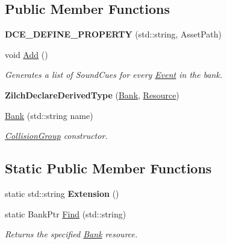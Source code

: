 \subsection*{Public Member Functions}
\begin{DoxyCompactItemize}
\item 
\hypertarget{classDCEngine_1_1Bank_afd76b244ded7d26fe0d197536d9193bb}{{\bfseries D\-C\-E\-\_\-\-D\-E\-F\-I\-N\-E\-\_\-\-P\-R\-O\-P\-E\-R\-T\-Y} (std\-::string, Asset\-Path)}\label{classDCEngine_1_1Bank_afd76b244ded7d26fe0d197536d9193bb}

\item 
\hypertarget{classDCEngine_1_1Bank_a0ec1031f0e4d80f1bdd2d27a2929a5eb}{void \hyperlink{classDCEngine_1_1Bank_a0ec1031f0e4d80f1bdd2d27a2929a5eb}{Add} ()}\label{classDCEngine_1_1Bank_a0ec1031f0e4d80f1bdd2d27a2929a5eb}

\begin{DoxyCompactList}\small\item\em Generates a list of Sound\-Cues for every \hyperlink{classDCEngine_1_1Event}{Event} in the bank. \end{DoxyCompactList}\item 
\hypertarget{classDCEngine_1_1Bank_aaf783acc5b1ef653f29e54ec52bd3610}{{\bfseries Zilch\-Declare\-Derived\-Type} (\hyperlink{classDCEngine_1_1Bank}{Bank}, \hyperlink{classDCEngine_1_1Resource}{Resource})}\label{classDCEngine_1_1Bank_aaf783acc5b1ef653f29e54ec52bd3610}

\item 
\hypertarget{classDCEngine_1_1Bank_ae83da3f3d70606509782927cf08e227b}{\hyperlink{classDCEngine_1_1Bank_ae83da3f3d70606509782927cf08e227b}{Bank} (std\-::string name)}\label{classDCEngine_1_1Bank_ae83da3f3d70606509782927cf08e227b}

\begin{DoxyCompactList}\small\item\em \hyperlink{classDCEngine_1_1CollisionGroup}{Collision\-Group} constructor. \end{DoxyCompactList}\end{DoxyCompactItemize}
\subsection*{Static Public Member Functions}
\begin{DoxyCompactItemize}
\item 
\hypertarget{classDCEngine_1_1Bank_af4b3d41bd8c66cc9454de552f3b340fc}{static std\-::string {\bfseries Extension} ()}\label{classDCEngine_1_1Bank_af4b3d41bd8c66cc9454de552f3b340fc}

\item 
static Bank\-Ptr \hyperlink{classDCEngine_1_1Bank_a1f4bb03abde770a8a9966ce669c24fdf}{Find} (std\-::string)
\begin{DoxyCompactList}\small\item\em Returns the specified \hyperlink{classDCEngine_1_1Bank}{Bank} resource. \end{DoxyCompactList}\end{DoxyCompactItemize}
